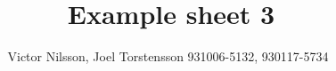 \documentclass[12pt,A4]{article}
\begin{document}
\parindent=0cm

\title{Example sheet 3}
\author{{\small Victor Nilsson, Joel Torstensson \hfill 931006-5132, 930117-5734 \,}}
\maketitle

\section{}

\newpage
\section{}

\end{document}
